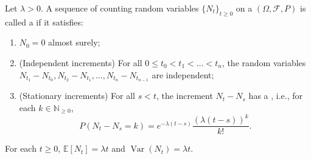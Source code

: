 \begin{definition} \label{definition:poisson_process_with_rate_parameter}
Let $\lambda > 0$. A sequence of counting random variables $\{N_t\}_{t \geq 0}$ on a  $(\Omega, \mathcal{F}, P)$ is called a  if it satisfies:

\begin{enumerate}
    \item $N_0 = 0$ almost surely;
    \item (Independent increments) For all $0 \leq t_0 < t_1 < \dots < t_n$, the random variables $N_{t_1} - N_{t_0}, N_{t_2} - N_{t_1}, \dots, N_{t_n} - N_{t_{n-1}}$ are independent;
    \item (Stationary increments) For all $s < t$, the increment $N_t - N_s$ has a , i.e., for each $k \in \mathbb{N}_{\geq 0}$,
    $$P(N_t - N_s = k) = e^{-\lambda(t - s)} \frac{(\lambda(t - s))^k}{k!}.$$
\end{enumerate}

For each $t \geq 0$, $\mathbb{E}[N_t] = \lambda t$ and $\operatorname{Var}(N_t) = \lambda t$.
\end{definition}
